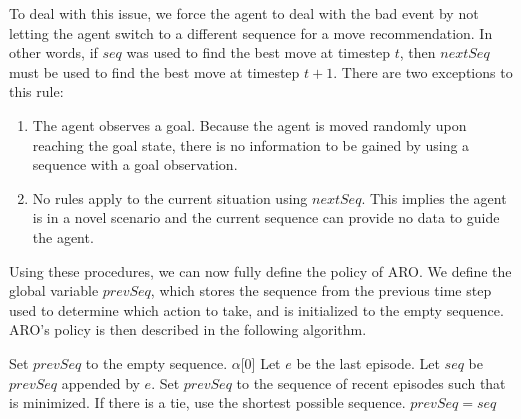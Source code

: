 \documentclass[letterpaper]{article} %
\begin{document}
To deal with this issue, we force the agent to deal with the bad event
by not letting the agent switch to a different sequence for a move
recommendation. In other words, if $seq$ was used to find the best
move at timestep $t$, then $nextSeq$ must be used to find the best
move at timestep $t+1$. There are two exceptions to this rule:
\begin{enumerate}
	\item The agent observes a goal. Because the agent is moved randomly upon reaching the goal state, there is no information to be gained by using a sequence with a goal observation.
	\item No rules apply to the current situation using $nextSeq$. This implies the agent is in a novel scenario and the current sequence can provide no data to guide the agent.
\end{enumerate}

Using these procedures, we can now fully define the policy of ARO. We
define the global variable $prevSeq$, which stores the sequence
from the previous time step used to determine which action to take,
and is initialized to the empty sequence. ARO's policy is then
described in the following algorithm.

\begin{algorithmic}[1]
			\State Set $prevSeq$ to the empty sequence.
			\State \Return $\alpha$[0]
		\EndIf
		\State Let $e$ be the last episode.
		\State Let $seq$ be $prevSeq$ appended by $e$.
			\State Set $prevSeq$ to the sequence of recent episodes such that  is minimized.
			\State If there is a tie, use the shortest possible sequence.
		\Else
			\State $prevSeq = seq$
		\EndIf
        \State \Return {}
	\EndFunction
	
\end{algorithmic}

\end{document}
